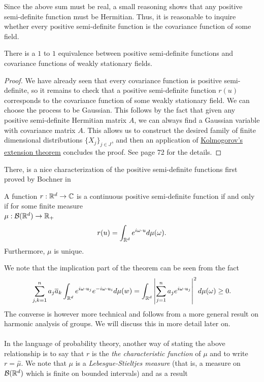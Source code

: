 \documentclass[
    a4paper,
    DIV=14,
    abstract=true,
    numbers=noenddot
]{scrartcl}
\begin{document}
Since the above sum must be real, a small reasoning  shows that any positive semi-definite function must be Hermitian. Thus, it is reasonable to inquire whether every positive semi-definite function is the covariance function of some field.
\begin{proposition}
	There is a $1$ to  $1$ equivalence between positive semi-definite functions and  covariance functions of weakly stationary fields.
\end{proposition}
\begin{proof}
	We have already seen that every covariance function is positive semi-definite, so it remains to check that a positive semi-definite function $r(u)$ corresponds to the  covariance function of some weakly stationary field. We can choose the process to be Gaussian. This follows by the fact that given any positive semi-definite Hermitian matrix $A$,  we can always find a Gaussian variable with covariance matrix $A$. This allows us to construct the desired family of finite dimensional distributions $\{X_j\}_{j \in  J}$, and then an application of \href{https://en.wikipedia.org/wiki/Kolmogorov_extension_theorem}{Kolmogorov's extension theorem} concludes the proof. See \cite{lindgren2012stationary} page 72 for the details.
\end{proof}
There, is a nice characterization of the positive semi-definite functions first proved by Bochner in \cite{bochner1933monotone}
\begin{theorem}\label{Bochner's theorem}
	A function $r:\mathbb{R}^d\to \mathbb{C}$ is a continuous positive semi-definite function if and only if for some finite measure\\ $\mu:\mathcal{B}(\mathbb{R}^d)\to \mathbb{R}_+$
	\begin{equation*}
		r(u)=\int_{\mathbb{R}^d} e^{i\omega\cdot u}d\mu (\omega).
	\end{equation*}
	Furthermore, $\mu $ is unique.
\end{theorem}
We note that the implication part of the theorem can be seen from the fact
\begin{equation*}
	\sum_{j,k=1}^{n} a_j \overline{a}_k\int_{\mathbb{R}^d} e^{i\omega\cdot u_j}e^{-i\omega\cdot u_i} d\mu(w)=\int_{\mathbb{R}^d}\left| \sum_{j=1}^{n} a_j e^{i\omega\cdot u_j} \right|^2d\mu(\omega)\geq 0.
\end{equation*}
The converse is however more technical and follows from a more general result on harmonic analysis of groups. We will discuss this in more detail later on.\\
\\
In the language of probability theory, another way of stating the above relationship is to say that $r$ is the  \emph{the characteristic function} of $\mu $ and to write $r=\hat{\mu}$. We note that $\mu $ is a \emph{Lebesgue-Stieltjes measure} (that is, a measure on $\mathcal{B}(\mathbb{R}^d)$ which is finite on bounded intervals) and as a result
\end{document}
